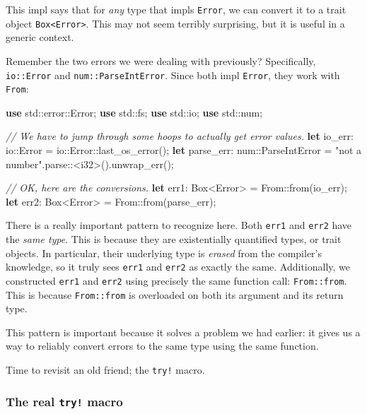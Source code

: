 \documentclass[a4paper,]{book}
\renewcommand*{\hypertarget}[3][\ar]{%
  \def\ar{#2}%
  \label{#1}%
  #3}
\newenvironment{Shaded}{\begin{snugshade}}{\end{snugshade}}
\newcommand{\KeywordTok}[1]{\textcolor[rgb]{0.13,0.29,0.53}{\textbf{{#1}}}}
\newcommand{\DataTypeTok}[1]{\textcolor[rgb]{0.13,0.29,0.53}{{#1}}}
\newcommand{\StringTok}[1]{\textcolor[rgb]{0.31,0.60,0.02}{{#1}}}
\newcommand{\CommentTok}[1]{\textcolor[rgb]{0.56,0.35,0.01}{\textit{{#1}}}}
\newcommand{\NormalTok}[1]{{#1}}
\begin{document}
This impl says that for \emph{any} type that impls \texttt{Error}, we
can convert it to a trait object
\texttt{Box\textless{}Error\textgreater{}}. This may not seem terribly
surprising, but it is useful in a generic context.

Remember the two errors we were dealing with previously? Specifically,
\texttt{io::Error} and \texttt{num::ParseIntError}. Since both impl
\texttt{Error}, they work with \texttt{From}:

\begin{Shaded}
\begin{Highlighting}[]
\KeywordTok{use} \NormalTok{std::error::Error;}
\KeywordTok{use} \NormalTok{std::fs;}
\KeywordTok{use} \NormalTok{std::io;}
\KeywordTok{use} \NormalTok{std::num;}

\CommentTok{// We have to jump through some hoops to actually get error values.}
\KeywordTok{let} \NormalTok{io_err: io::Error = io::Error::last_os_error();}
\KeywordTok{let} \NormalTok{parse_err: num::ParseIntError = }\StringTok{"not a number"}\NormalTok{.parse::<}\DataTypeTok{i32}\NormalTok{>().unwrap_err();}

\CommentTok{// OK, here are the conversions.}
\KeywordTok{let} \NormalTok{err1: }\DataTypeTok{Box}\NormalTok{<Error> = From::from(io_err);}
\KeywordTok{let} \NormalTok{err2: }\DataTypeTok{Box}\NormalTok{<Error> = From::from(parse_err);}
\end{Highlighting}
\end{Shaded}

There is a really important pattern to recognize here. Both
\texttt{err1} and \texttt{err2} have the \emph{same type}. This is
because they are existentially quantified types, or trait objects. In
particular, their underlying type is \emph{erased} from the compiler's
knowledge, so it truly sees \texttt{err1} and \texttt{err2} as exactly
the same. Additionally, we constructed \texttt{err1} and \texttt{err2}
using precisely the same function call: \texttt{From::from}. This is
because \texttt{From::from} is overloaded on both its argument and its
return type.

This pattern is important because it solves a problem we had earlier: it
gives us a way to reliably convert errors to the same type using the
same function.

Time to revisit an old friend; the \texttt{try!} macro.

\hypertarget{the-real-try-macro}{\subsubsection{\texorpdfstring{The real
\texttt{try!} macro}{The real try! macro}}\label{the-real-try-macro}}
\end{document}
